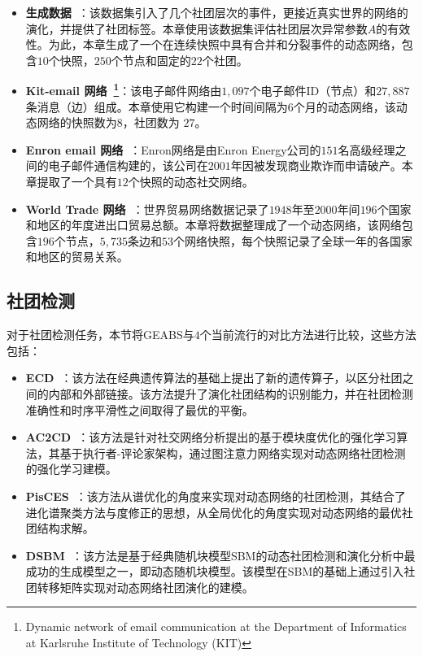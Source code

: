\begin{itemize}

\item \textbf{生成数据~\cite{greene2010tracking}}：该数据集引入了几个社团层次的事件，更接近真实世界的网络的演化，并提供了社团标签。本章使用该数据集评估社团层次异常参数$A$的有效性。为此，本章生成了一个在连续快照中具有合并和分裂事件的动态网络，包含$10$个快照，$250$个节点和固定的$22$个社团。

\item \textbf{Kit-email 网络~\footnote{Dynamic network of email communication at the Department of Informatics at Karlsruhe Institute of Technology (KIT)}}：该电子邮件网络由$1,097$个电子邮件ID（节点）和$27,887$条消息（边）组成。本章使用它构建一个时间间隔为$6$个月的动态网络，该动态网络的快照数为$8$，社团数为 $27$。

\item \textbf{Enron email 网络~\cite{benston2002enron}}：Enron网络是由Enron Energy公司的$151$名高级经理之间的电子邮件通信构建的，该公司在$2001$年因被发现商业欺诈而申请破产。本章提取了一个具有$12$个快照的动态社交网络。

\item \textbf{World Trade 网络~\cite{worldset2002}}：世界贸易网络数据记录了$1948$年至$2000$年间$196$个国家和地区的年度进出口贸易总额。本章将数据整理成了一个动态网络，该网络包含$196$个节点，$5,735$条边和$53$个网络快照，每个快照记录了全球一年的各国家和地区的贸易关系。
\end{itemize}




\subsection{社团检测}
对于社团检测任务，本节将GEABS与$4$个当前流行的对比方法进行比较，这些方法包括：
\begin{itemize}
  \item \textbf{ECD~\cite{liu2019evolutionary}}：该方法在经典遗传算法的基础上提出了新的遗传算子，以区分社团之间的内部和外部链接。该方法提升了演化社团结构的识别能力，并在社团检测准确性和时序平滑性之间取得了最优的平衡。
    \item \textbf{AC2CD~\cite{COSTA2023110202}}：该方法是针对社交网络分析提出的基于模块度优化的强化学习算法，其基于执行者-评论家架构，通过图注意力网络实现对动态网络社团检测的强化学习建模。
  \item \textbf{PisCES~\cite{liu2018using}}：该方法从谱优化的角度来实现对动态网络的社团检测，其结合了进化谱聚类方法与度修正的思想，从全局优化的角度实现对动态网络的最优社团结构求解。
  \item \textbf{DSBM~\cite{yang2011detecting}}：该方法是基于经典随机块模型SBM的动态社团检测和演化分析中最成功的生成模型之一，即动态随机块模型。该模型在SBM的基础上通过引入社团转移矩阵实现对动态网络社团演化的建模。
\end{itemize}


